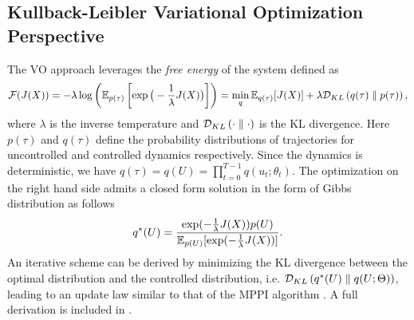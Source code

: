 \documentclass[twoside,11pt]{article}
\begin{document}
\subsection{Kullback-Leibler Variational Optimization Perspective}
\label{sec: kl_vo}
The \ac{VO} approach \citep{williams2017information} leverages the \textit{free energy} of the system defined as
\begin{equation} \label{eq: free_energy}
\mathcal{F}(J(X)) = -\lambda\log\left(\mathbb{E}_{p(\tau)}\left[\exp\big(-\frac{1}{\lambda}J(X)\big)\right]\right) = \min_q \mathbb{E}_{q(\tau)}[J(X)] + \lambda \mathcal{D}_{KL}\left({q(\tau)}\parallel {p(\tau)}\right),
\end{equation}
where $\lambda$ is the inverse temperature and $\mathcal{D}_{KL}\left({\cdot}\parallel {\cdot}\right)$ is the KL divergence. Here $p(\tau)$ and $q(\tau)$ define the probability distributions of trajectories for uncontrolled and controlled dynamics respectively. Since the dynamics is deterministic, we have $q(\tau)=q(U)=\prod_{t=0}^{T-1} q(u_t;\theta_t)$. The optimization on the right hand side admits a closed form solution in the form of Gibbs distribution as follows
\begin{equation} \label{eq: vo_update}
q^*(U) = \frac{\exp(-\frac{1}{\lambda} J(X))p(U)}{\mathbb{E}_{p(U)} [\exp(-\frac{1}{\lambda} J(X))]}.
\end{equation}
An iterative scheme can be derived by minimizing the KL divergence between the optimal distribution and the controlled distribution, i.e. $\mathcal{D}_{KL}\left({q^*(U)}\parallel {q(U;\Theta)}\right)$, leading to an update law similar to that of the \ac{MPPI} algorithm \citep{williams2016aggressive}. A full derivation is included in .
\end{document}
